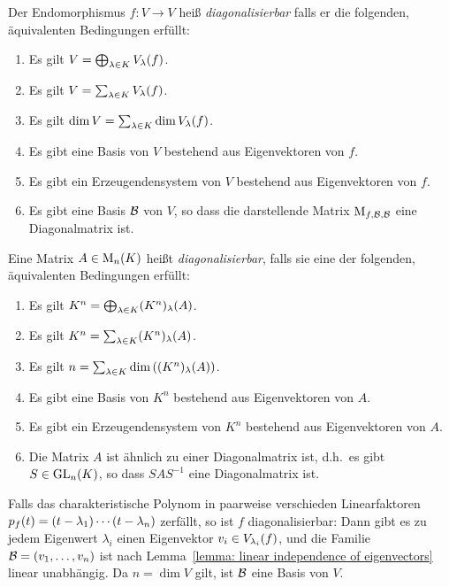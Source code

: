 \begin{definition}
  Der Endomorphismus $f \colon V \to V$ heiß \emph{diagonalisierbar} falls er die folgenden, äquivalenten Bedingungen erfüllt:
  \begin{enumerate}[label = \arabic*.]
    \item
      Es gilt $V = \bigoplus_{\lambda \in K} \eigenspace{V}{f}{\lambda}$.
    \item
      Es gilt $V = \sum_{\lambda \in K} \eigenspace{V}{f}{\lambda}$.
    \item
      Es gilt $\dim V = \sum_{\lambda \in K} \dim \eigenspace{V}{f}{\lambda}$.
    \item
      Es gibt eine Basis von $V$ bestehend aus Eigenvektoren von $f$.
    \item
      Es gibt ein Erzeugendensystem von $V$ bestehend aus Eigenvektoren von $f$.
    \item
      Es gibt eine Basis $\basis{B}$ von $V$, so dass die darstellende Matrix $\repmatrixendo{f}{\basis{B}}$ eine Diagonalmatrix ist.
  \end{enumerate}
  Eine Matrix $A \in \matrices{n}{K}$ heißt \emph{diagonalisierbar}, falls sie eine der folgenden, äquivalenten Bedingungen erfüllt:
  \begin{enumerate}[label = \arabic*.]
    \item
      Es gilt $K^n = \bigoplus_{\lambda \in K} \eigenspace{(K^n)}{A}{\lambda}$.
    \item
      Es gilt $K^n = \sum_{\lambda \in K} \eigenspace{(K^n)}{A}{\lambda}$.
    \item
      Es gilt $n = \sum_{\lambda \in K} \dim \left(\eigenspace{(K^n)}{A}{\lambda} \right)$.
    \item
      Es gibt eine Basis von $K^n$ bestehend aus Eigenvektoren von $A$.
    \item
      Es gibt ein Erzeugendensystem von $K^n$ bestehend aus Eigenvektoren von $A$.
    \item
      Die Matrix $A$ ist ähnlich zu einer Diagonalmatrix ist, d.h.\ es gibt $S \in \GL{n}{K}$, so dass $S A S^{-1}$ eine Diagonalmatrix ist.
  \end{enumerate}
\end{definition}

\begin{example}
  Falls das charakteristische Polynom in paarweise verschieden Linearfaktoren $\charpol{f}(t) = (t - \lambda_1) \dotsm (t - \lambda_n)$ zerfällt, so ist $f$ diagonalisierbar:
  Dann gibt es zu jedem Eigenwert $\lambda_i$ einen Eigenvektor $v_i \in \eigenspace{V}{f}{\lambda_i}$, und die Familie $\basis{B} = (v_1, \dotsc, v_n)$ ist nach Lemma~\ref{lemma: linear independence of eigenvectors} linear unabhängig.
  Da $n = \dim V$ gilt, ist $\basis{B}$ eine Basis von $V$.
\end{example}


